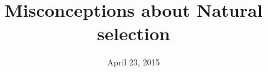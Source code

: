 





\title[Selection Misconceptions]{Misconceptions about Natural selection}
\date{April 23, 2015}



\begin{noheadline}
\maketitle
\end{noheadline}


